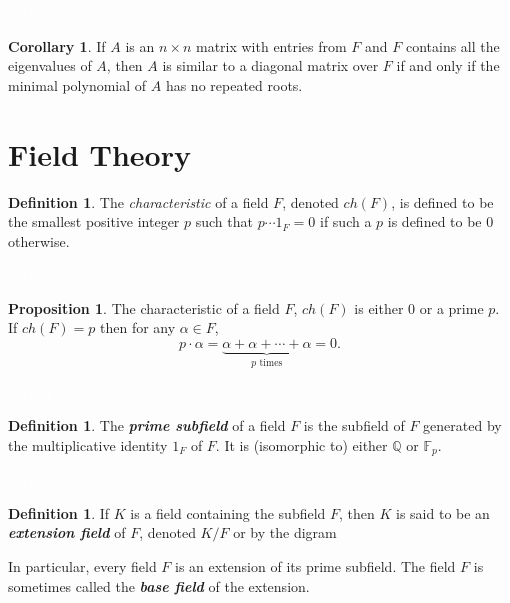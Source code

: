 \documentclass{article}
\theoremstyle{definition}
\newtheorem{prop}[thm]{Proposition}
\newtheorem{cor}[thm]{Corollary}
\newtheorem{defn}[thm]{Definition}
\newcommand{\nl}{\textcolor{white}{nothing}}
\newcommand{\Q}{\mathbb{Q}}
\newcommand{\F}{\mathbb{F}}
\newcommand{\al}{\alpha}
\begin{document}
\nl

\begin{cor}
If $A$ is an $n\times n$ matrix with entries from $F$ and $F$ contains all the eigenvalues of $A$, then $A$ is similar to a diagonal matrix over $F$ if and only if the minimal polynomial of $A$ has no repeated roots.
\end{cor}

\section{Field Theory}
\setcounter{thm}{0}

\begin{defn}
The \textit{characteristic} of a field $F$, denoted $ch(F)$, is defined to be the smallest positive integer $p$ such that $p\cdots 1_F = 0$ if such a $p$ is defined to be 0 otherwise. 
\end{defn}

\nl

\begin{prop}
The characteristic of a field $F$, $ch(F)$ is either 0 or a prime $p$. If $ch(F) = p$ then for any $\al \in F$,
\[p\cdot \al = \underbrace{\al + \al + \cdots + \al}_{\text{$p$ times}} = 0.\]
\end{prop}

\nl

\begin{defn}
The \textit{\textbf{prime subfield}} of a field $F$ is the subfield of $F$ generated by the multiplicative identity $1_F$ of $F$. It is (isomorphic to) either $\Q$ or $\F_p$.
\end{defn}

\nl

\begin{defn}
If $K$ is a field containing the subfield $F$, then $K$ is said to be an \textit{\textbf{extension field}} of $F$, denoted $K/F$ or by the digram 
\begin{center}
\end{center}
In particular, every field $F$ is an extension of its prime subfield. The field $F$ is sometimes called the \textit{\textbf{base field}} of the extension.
\end{defn}
\end{document}
